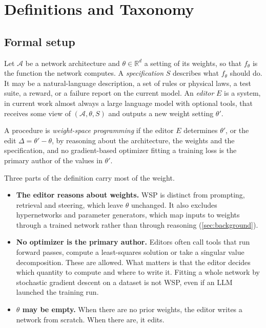 \section{Definitions and Taxonomy}
\label{sec:defs}

\subsection{Formal setup}

Let $\mathcal{A}$ be a network architecture and $\theta \in \mathbb{R}^{d}$ a setting of its weights, so that $f_{\theta}$ is the function the network computes. A \emph{specification} $S$ describes what $f_{\theta}$ should do. It may be a natural-language description, a set of rules or physical laws, a test suite, a reward, or a failure report on the current model. An \emph{editor} $E$ is a system, in current work almost always a large language model with optional tools, that receives some view of $(\mathcal{A}, \theta, S)$ and outputs a new weight setting $\theta'$.

\begin{definition}
\label{def:wsp}
A procedure is \emph{weight-space programming} if the editor $E$ determines $\theta'$, or the edit $\Delta = \theta' - \theta$, by reasoning about the architecture, the weights and the specification, and no gradient-based optimizer fitting a training loss is the primary author of the values in $\theta'$.
\end{definition}

Three parts of the definition carry most of the weight.
\begin{itemize}[leftmargin=*,itemsep=2pt]
\item \textbf{The editor reasons about weights.} WSP is distinct from prompting, retrieval and steering, which leave $\theta$ unchanged. It also excludes hypernetworks and parameter generators, which map inputs to weights through a trained network rather than through reasoning (\cref{sec:background}).
\item \textbf{No optimizer is the primary author.} Editors often call tools that run forward passes, compute a least-squares solution or take a singular value decomposition. These are allowed. What matters is that the editor decides which quantity to compute and where to write it. Fitting a whole network by stochastic gradient descent on a dataset is not WSP, even if an LLM launched the training run.
\item \textbf{$\theta$ may be empty.} When there are no prior weights, the editor writes a network from scratch. When there are, it edits.
\end{itemize}

